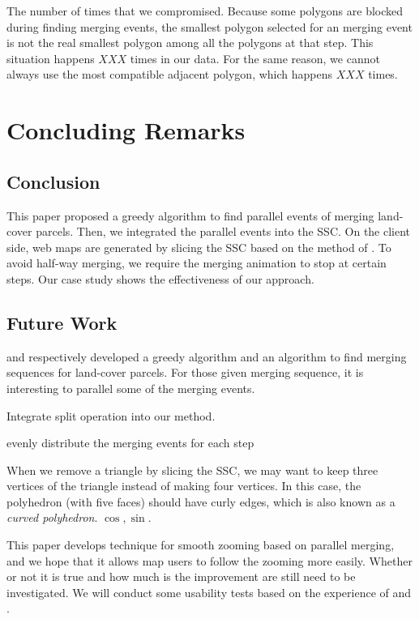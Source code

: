 \documentclass[ijgi,article,submit,moreauthors,pdftex]{Definitions/mdpi}
\begin{document}
The number of times that we compromised.
Because some polygons are blocked during finding merging events, 
the smallest polygon selected for an merging event 
is not the real smallest polygon 
among all the polygons at that step. 
This situation happens $XXX$ times in our data.
For the same reason, 
we cannot always use the most compatible adjacent polygon,
which happens $XXX$ times.






\section{Concluding Remarks}
\label{sec:concluding_remarks}

\subsection{Conclusion}
This paper proposed a greedy algorithm to find parallel events of 
merging land-cover parcels.
Then, we integrated the parallel events into the SSC. 
On the client side, web maps are generated by slicing the SSC
based on the method of \citet{Meijers2020Web}.
To avoid half-way merging, we require the merging animation 
to stop at certain steps.
Our case study shows the effectiveness of our approach.


\subsection{Future Work}

\citet{vanOosterom2005} and \citet[]{Peng2019Thesis}
respectively developed a greedy algorithm and an \Astar algorithm to find
merging sequences for land-cover parcels.
For those given merging sequence,
it is interesting to parallel some of the merging events.

Integrate split operation into our method.

evenly distribute the merging events for each step

When we remove a triangle by slicing the SSC, 
we may want to keep three vertices of the triangle 
instead of making four vertices.
In this case, the polyhedron (with five faces) should have curly edges,
which is also known as a \emph{curved polyhedron}.
$\cos, \sin$.

This paper develops technique for smooth zooming based on parallel merging,
and we hope that it allows map users to follow the zooming more easily.
Whether or not it is true and how much is the improvement 
are still need to be investigated.
We will conduct some usability tests based on the experience of
\citet[]{Suba2017Thesis} and \citet{Midtbo2007}.
\end{document}
